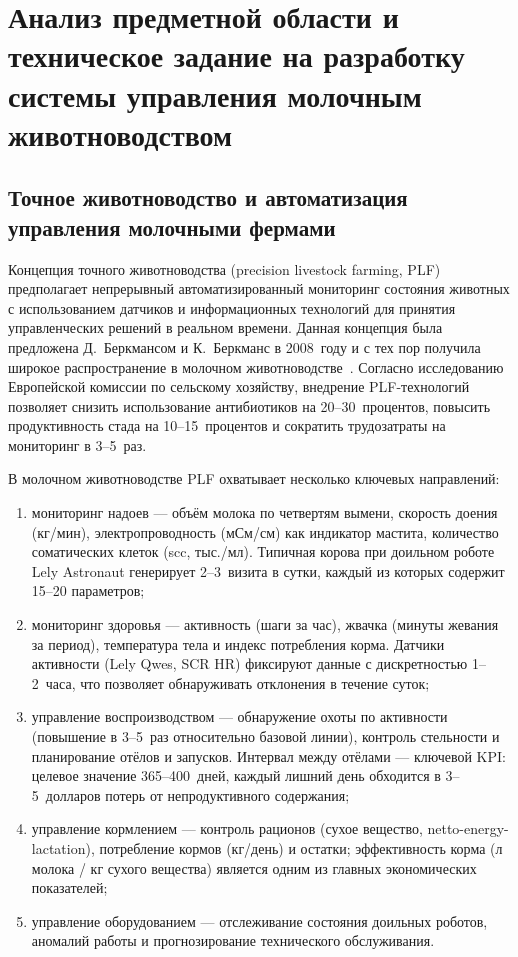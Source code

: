 \section{Анализ предметной области и техническое задание на разработку системы управления молочным животноводством}

\subsection{Точное животноводство и автоматизация управления молочными фермами}

Концепция точного животноводства (precision livestock farming, PLF)~\cite{PrecisionLivestock} предполагает непрерывный автоматизированный мониторинг состояния животных с использованием датчиков и информационных технологий для принятия управленческих решений в реальном времени. Данная концепция была предложена Д.~Беркмансом и К.~Беркманс в 2008~году и с тех пор получила широкое распространение в молочном животноводстве~\cite{DairyPrecision}. Согласно исследованию Европейской комиссии по сельскому хозяйству, внедрение PLF-технологий позволяет снизить использование антибиотиков на 20--30~процентов, повысить продуктивность стада на 10--15~процентов и сократить трудозатраты на мониторинг в 3--5~раз.

В молочном животноводстве PLF охватывает несколько ключевых направлений:
\begin{enumerate}
    \item мониторинг надоев --- объём молока по четвертям вымени, скорость доения (кг/мин), электропроводность (мСм/см) как индикатор мастита, количество соматических клеток (\acrshort{scc}, тыс./мл). Типичная корова при доильном роботе Lely Astronaut генерирует 2--3~визита в сутки, каждый из которых содержит 15--20 параметров;
    \item мониторинг здоровья --- активность (шаги за час), жвачка (минуты жевания за период), температура тела и индекс потребления корма. Датчики активности (Lely Qwes, SCR HR) фиксируют данные с дискретностью 1--2~часа, что позволяет обнаруживать отклонения в течение суток;
    \item управление воспроизводством --- обнаружение охоты по активности (повышение в 3--5~раз относительно базовой линии), контроль стельности и планирование отёлов и запусков. Интервал между отёлами --- ключевой KPI: целевое значение 365--400~дней, каждый лишний день обходится в 3--5~долларов потерь от непродуктивного содержания;
    \item управление кормлением --- контроль рационов (сухое вещество, netto-energy-lactation), потребление кормов (кг/день) и остатки; эффективность корма (л молока / кг сухого вещества) является одним из главных экономических показателей;
    \item управление оборудованием --- отслеживание состояния доильных роботов, аномалий работы и прогнозирование технического обслуживания.
\end{enumerate}

